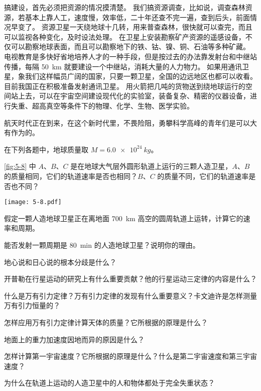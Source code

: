 搞建设，首先必须把资源的情况摸清楚。
我们搞资源调查，比如说，调查森林资源，若基本上靠人工，速度慢，效率低，二十年还查不完一遍，查到后头，前面情况早变了。
资源卫星一天绕地球十几转，用来普查森林，很快就可以查完，而且可以监视各种变化，及时设法处理。
在卫星上安装勘察矿产资源的遥感设备，不仅可以勘察地球表面，而且可以勘察地下的铁、钴、镍、铜、石油等多种矿藏。
电视教育是多快好省地培养人才的一种手段，但是按过去的办法靠发射台和中继站传播，每隔 \qty{50}{km} 就要建设一个中继站，消耗大量的人力物力。
如果用通讯卫星，象我们这样幅员广阔的国家，只要一颗卫星，全国的边远地区也都可以收看。
目前我国正在积极准备发射通讯卫星。
用火箭把几吨的货物送到绕地球运行的空间站上去，可以在宇宙空间建设现代化的实验室，装备复杂、精密的仪器设备，进行失重、超高真空等条件下的物理、化学、生物、医学实验。

航天时代正在到来，在这个新时代里，不畏险阻，勇攀科学高峰的青年们是可以大有作为的。	
	
\begin{Practice}
在下列各题中，地球质量取 $M=\qty{6.0e24}{kg}$。
\begin{question}
	\item \cref{fig:5-8} 中 $A$、$B$、$C$ 是在地球大气层外圆形轨道上运行的三颗人造卫星，$A$、$B$ 的质量相同，它们的轨道速率是否也相同？$B$、$C$ 的质量不同，它们的轨道速率是否也不同？
	\begin{figurehere}
		\begin{minipage}{\linewidth}\centering
			\texttt{[image: 5-8.pdf]}
			\caption{}\label{fig:5-8}
		\end{minipage}
	\end{figurehere}
	\item  假定一颗人造地球卫星正在离地面 \qty{700}{km} 高空的圆周轨道上运转，计算它的速率和周期。
	\item 能否发射一颗周期是 \qty{80}{min} 的人造地球卫星？说明你的理由。
\end{question}
\end{Practice}

\begin{Review}
\begin{question}
	\item 地心说和日心说的根本分歧是什么？
	\item 开普勒在行星运动的研究上有什么重要贡献？他的行星运动三定律的内容是什么？
	\item 什么是万有引力定律？万有引力定律的发现有什么重要意义？卡文迪许是怎样测量万有引力恒量的？
	\item 怎样应用万有引力定律计算天体的质量？它所根据的原理是什么？
	\item 地面上的重力加速度因地而异的原因是什么？
	\item 怎样计算第一宇宙速度？它所根据的原理是什么？什么是第二宇宙速度和第三宇宙速度？
	\item 为什么在轨道上运动的人造卫星中的人和物体都处于完全失重状态？
\end{question}
\end{Review}


